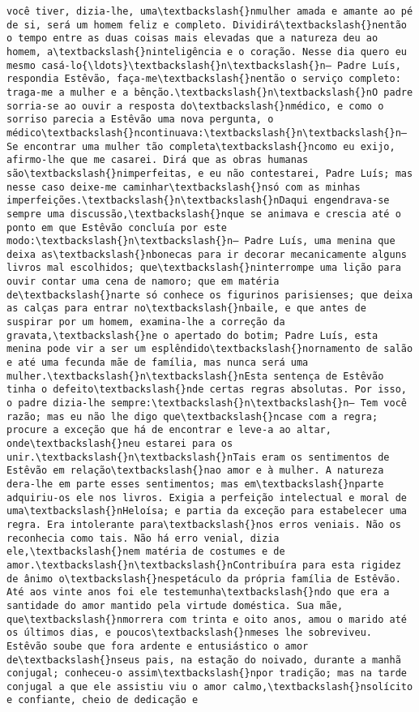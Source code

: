 \begin{Verbatim}[commandchars=\\\{\}]
você tiver, dizia-lhe, uma\textbackslash{}nmulher amada e amante ao pé de si, será um homem feliz e completo. Dividirá\textbackslash{}nentão o tempo entre as duas coisas mais elevadas que a natureza deu ao homem, a\textbackslash{}ninteligência e o coração. Nesse dia quero eu mesmo casá-lo{\ldots}\textbackslash{}n\textbackslash{}n— Padre Luís, respondia Estêvão, faça-me\textbackslash{}nentão o serviço completo: traga-me a mulher e a bênção.\textbackslash{}n\textbackslash{}nO padre sorria-se ao ouvir a resposta do\textbackslash{}nmédico, e como o sorriso parecia a Estêvão uma nova pergunta, o médico\textbackslash{}ncontinuava:\textbackslash{}n\textbackslash{}n— Se encontrar uma mulher tão completa\textbackslash{}ncomo eu exijo, afirmo-lhe que me casarei. Dirá que as obras humanas são\textbackslash{}nimperfeitas, e eu não contestarei, Padre Luís; mas nesse caso deixe-me caminhar\textbackslash{}nsó com as minhas imperfeições.\textbackslash{}n\textbackslash{}nDaqui engendrava-se sempre uma discussão,\textbackslash{}nque se animava e crescia até o ponto em que Estêvão concluía por este modo:\textbackslash{}n\textbackslash{}n— Padre Luís, uma menina que deixa as\textbackslash{}nbonecas para ir decorar mecanicamente alguns livros mal escolhidos; que\textbackslash{}ninterrompe uma lição para ouvir contar uma cena de namoro; que em matéria de\textbackslash{}narte só conhece os figurinos parisienses; que deixa as calças para entrar no\textbackslash{}nbaile, e que antes de suspirar por um homem, examina-lhe a correção da gravata,\textbackslash{}ne o apertado do botim; Padre Luís, esta menina pode vir a ser um esplêndido\textbackslash{}nornamento de salão e até uma fecunda mãe de família, mas nunca será uma mulher.\textbackslash{}n\textbackslash{}nEsta sentença de Estêvão tinha o defeito\textbackslash{}nde certas regras absolutas. Por isso, o padre dizia-lhe sempre:\textbackslash{}n\textbackslash{}n— Tem você razão; mas eu não lhe digo que\textbackslash{}ncase com a regra; procure a exceção que há de encontrar e leve-a ao altar, onde\textbackslash{}neu estarei para os unir.\textbackslash{}n\textbackslash{}nTais eram os sentimentos de Estêvão em relação\textbackslash{}nao amor e à mulher. A natureza dera-lhe em parte esses sentimentos; mas em\textbackslash{}nparte adquiriu-os ele nos livros. Exigia a perfeição intelectual e moral de uma\textbackslash{}nHeloísa; e partia da exceção para estabelecer uma regra. Era intolerante para\textbackslash{}nos erros veniais. Não os reconhecia como tais. Não há erro venial, dizia ele,\textbackslash{}nem matéria de costumes e de amor.\textbackslash{}n\textbackslash{}nContribuíra para esta rigidez de ânimo o\textbackslash{}nespetáculo da própria família de Estêvão. Até aos vinte anos foi ele testemunha\textbackslash{}ndo que era a santidade do amor mantido pela virtude doméstica. Sua mãe, que\textbackslash{}nmorrera com trinta e oito anos, amou o marido até os últimos dias, e poucos\textbackslash{}nmeses lhe sobreviveu. Estêvão soube que fora ardente e entusiástico o amor de\textbackslash{}nseus pais, na estação do noivado, durante a manhã conjugal; conheceu-o assim\textbackslash{}npor tradição; mas na tarde conjugal a que ele assistiu viu o amor calmo,\textbackslash{}nsolícito e confiante, cheio de dedicação e 
\end{Verbatim}
